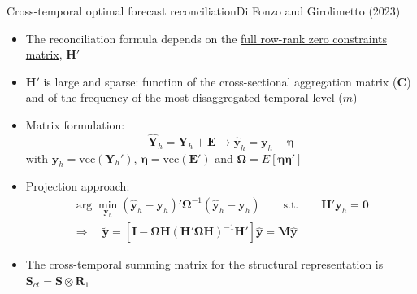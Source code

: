 \documentclass[aspectratio=169, table,colorlinks]{beamer}
\newcommand{\yvet}{\bm{y}}
\newcommand{\Cvet}{\bm{C}}
\newcommand{\Evet}{\bm{E}}
\newcommand{\Hvet}{\bm{H}}
\newcommand{\Ivet}{\bm{I}}
\newcommand{\Mvet}{\bm{M}}
\newcommand{\Rvet}{\bm{R}}
\newcommand{\Svet}{\bm{S}}
\newcommand{\Yvet}{\bm{Y}}
\newcommand{\Zerovet}{\bm{0}}
\newcommand{\Omegavet}{\bm{\Omega}}
\newcommand{\etavet}{\bm{\eta}}
\begin{document}
\begin{frame}[label = {cap:ctreco}]{Cross-temporal optimal forecast reconciliation}{Di Fonzo and Girolimetto (2023)}
	\begin{itemize}
	\item The reconciliation formula depends on the \hyperlink{app:ctH}{\color{newblue}full row-rank zero constraints matrix}, $\Hvet'$
	\item $\Hvet'$ is {\color{newred}large} and {\color{newblue}sparse}: function of the {\color{newblue}cross-sectional aggregation matrix} ($\Cvet$) and of the {\color{newblue}frequency of the most disaggregated temporal level} ($m$)
	\item Matrix formulation:
	$$\widehat{\Yvet}_h = \Yvet_h + \Evet \longrightarrow \widehat{\yvet}_h = \yvet_h + \etavet$$
	with $\yvet _h= \text{vec}\left(\Yvet_h'\right)$, $\etavet = \text{vec}\left(\Evet'\right)$ and $\Omegavet = E\left[\etavet\etavet'\right]$
	
	\item {\color{newblue}Projection approach}: 
		$$
		\begin{array}{c}
			\arg \displaystyle\min_{\yvet_h} \left(\widehat{\yvet}_h - \yvet_h\right)' \Omegavet^{-1} \left(\widehat{\yvet}_h - \yvet_h\right) \qquad \text{s.t.} \qquad \Hvet'\yvet_h = \Zerovet\\[0.25cm]
			\Rightarrow\quad \widetilde{\yvet}= \left[\Ivet -\Omegavet\Hvet\left(\Hvet'\Omegavet\Hvet\right)^{-1}\Hvet'\right] \widehat{\yvet} = \Mvet \widehat{\yvet}
		\end{array}
		$$
		\item The {\color{newblue}cross-temporal summing matrix} for the structural representation is $\Svet_{ct} = \Svet \otimes \Rvet_1$
	\end{itemize}
\end{frame}
\end{document}
